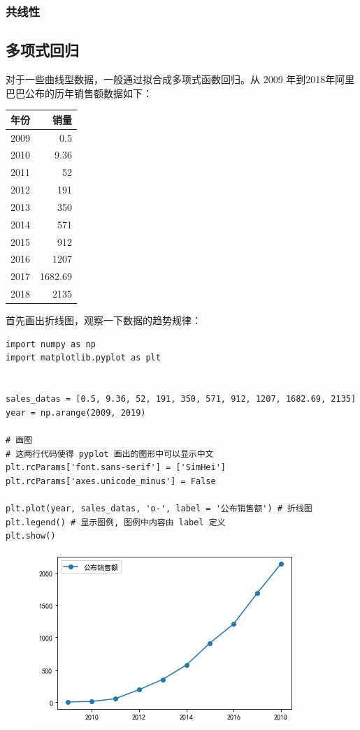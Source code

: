 \subsubsection{共线性}

\subsection{多项式回归}

对于一些曲线型数据，一般通过拟合成多项式函数回归。从 2009 年到2018年阿里巴巴公布的历年销售额数据如下：

\begin{table}[!ht]
\centering
\begin{tabular}{|l|r|}
\hline

年份 & 销量 \\ \hline
2009 & 0.5 \\ \hline
2010 & 9.36 \\ \hline
2011 & 52 \\ \hline
2012 & 191 \\ \hline
2013 & 350 \\ \hline
2014 & 571 \\ \hline
2015 & 912 \\ \hline
2016 & 1207 \\ \hline
2017 & 1682.69 \\ \hline
2018 & 2135 \\ \hline

\end{tabular}
\end{table}

首先画出折线图，观察一下数据的趋势规律：

\begin{lstlisting}[Language=Python]
import numpy as np
import matplotlib.pyplot as plt


sales_datas = [0.5, 9.36, 52, 191, 350, 571, 912, 1207, 1682.69, 2135]
year = np.arange(2009, 2019)

# 画图
# 这两行代码使得 pyplot 画出的图形中可以显示中文
plt.rcParams['font.sans-serif'] = ['SimHei']
plt.rcParams['axes.unicode_minus'] = False

plt.plot(year, sales_datas, 'o-', label = '公布销售额') # 折线图
plt.legend() # 显示图例, 图例中内容由 label 定义
plt.show()
\end{lstlisting}

\begin{figure}[ht]
  \centering
  \includegraphics[scale=0.8]{figure/polyRegression1.png}
\end{figure}

